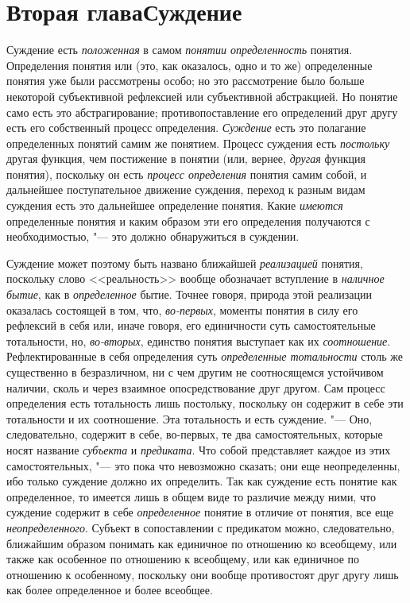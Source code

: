 {\chapter[Вторая глава Суждение]{Вторая глава\newline Суждение}
Суждение есть {\em положенная} в самом {\em понятии определенность}
понятия. Определения понятия или (это, как оказалось, одно и
то же) определенные понятия уже были рассмотрены особо; но это рассмотрение
было больше некоторой субъективной рефлексией или субъективной абстракцией.
Но понятие само есть это абстрагирование; противопоставление его
определений друг другу есть его собственный процесс определения.
{\em Суждение} есть это
полагание определенных понятий самим же понятием. Процесс суждения есть
{\em постольку} другая функция, чем постижение в понятии (или, вернее,
{\em другая} функция понятия), поскольку он есть {\em процесс
определения} понятия самим собой, и дальнейшее
поступательное движение суждения, переход к разным видам
суждения есть это дальнейшее определение понятия. Какие {\em имеются}
определенные понятия и каким образом эти его определения
получаются с необходимостью, "--- это должно обнаружиться в
суждении.

Суждение может поэтому быть названо ближайшей
{\em реализацией}
понятия, поскольку слово <<реальность>> вообще обозначает
вступление в {\em наличное бытие},
как в {\em определенное}
бытие. Точнее говоря, природа этой реализации оказалась
состоящей в том, что, {\em во-первых},
моменты понятия в силу его рефлексий в себя или, иначе
говоря, его единичности суть самостоятельные тотальности, но,
{\em во-вторых}, единство понятия выступает как их {\em соотношение}.
Рефлектированные в себя определения суть
{\em определенные тотальности}
столь же существенно в безразличном, ни с чем другим не
соотносящемся устойчивом наличии, сколь и через взаимное опосредствование
друг другом. Сам процесс определения есть тотальность лишь постольку,
поскольку он содержит в себе эти тотальности и их соотношение. Эта
тотальность и есть суждение. "--- Оно, следовательно, содержит
в себе, во-первых, те два самостоятельных, которые носят название
{\em субъекта} и {\em предиката}. Что
собой представляет каждое из этих самостоятельных, "--- это
пока что невозможно сказать; они еще неопределенны, ибо только суждение
должно их определить. Так как суждение есть понятие как определенное, то
имеется лишь в общем виде то различие между ними, что суждение содержит в
себе {\em определенное}
понятие в отличие от понятия, все еще
{\em неопределенного}.
Субъект в сопоставлении с предикатом можно, следовательно,
ближайшим образом понимать как единичное по отношению ко всеобщему, или
также как особенное по отношению к всеобщему, или как единичное по
отношению к особенному, поскольку они вообще противостоят друг другу лишь
как более определенное и более всеобщее.

}
